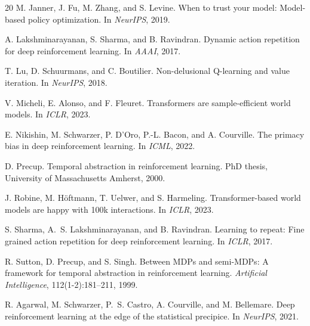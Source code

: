 \documentclass[letterpaper]{article}
\begin{document}
\begin{thebibliography}{20}
M. Janner, J. Fu, M. Zhang, and S. Levine.
\newblock When to trust your model: Model-based policy optimization.
\newblock In \emph{NeurIPS}, 2019.

A. Lakshminarayanan, S. Sharma, and B. Ravindran.
\newblock Dynamic action repetition for deep reinforcement learning.
\newblock In \emph{AAAI}, 2017.

T. Lu, D. Schuurmans, and C. Boutilier.
\newblock Non-delusional Q-learning and value iteration.
\newblock In \emph{NeurIPS}, 2018.

V. Micheli, E. Alonso, and F. Fleuret.
\newblock Transformers are sample-efficient world models.
\newblock In \emph{ICLR}, 2023.

E. Nikishin, M. Schwarzer, P. D'Oro, P.-L. Bacon, and A. Courville.
\newblock The primacy bias in deep reinforcement learning.
\newblock In \emph{ICML}, 2022.

D. Precup.
\newblock Temporal abstraction in reinforcement learning.
\newblock PhD thesis, University of Massachusetts Amherst, 2000.

J. Robine, M. H{\"o}ftmann, T. Uelwer, and S. Harmeling.
\newblock Transformer-based world models are happy with 100k interactions.
\newblock In \emph{ICLR}, 2023.

S. Sharma, A.~S. Lakshminarayanan, and B. Ravindran.
\newblock Learning to repeat: Fine grained action repetition for deep reinforcement learning.
\newblock In \emph{ICLR}, 2017.

R. Sutton, D. Precup, and S. Singh.
\newblock Between MDPs and semi-MDPs: A framework for temporal abstraction in reinforcement learning.
\newblock \emph{Artificial Intelligence}, 112(1-2):181--211, 1999.

R. Agarwal, M. Schwarzer, P.~S. Castro, A. Courville, and M. Bellemare.
\newblock Deep reinforcement learning at the edge of the statistical precipice.
\newblock In \emph{NeurIPS}, 2021.

\end{thebibliography}
\end{document}
